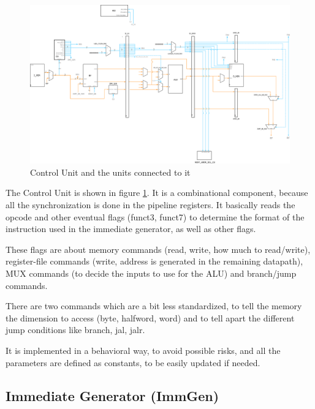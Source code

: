 \documentclass[a4paper]{article}
\begin{document}
\begin{figure}[hbtp]
    \centering
    \includegraphics[scale=0.3]{../cu/ref/schematic/cu.png}
    \caption{Control Unit and the units connected to it}
    \label{fig:cu}
\end{figure}

The Control Unit is shown in figure \ref{fig:cu}. It is a combinational component, because all the synchronization is done in the pipeline registers. It basically reads the opcode and other eventual flags (funct3, funct7) to determine the format of the instruction used in the immediate generator, as well as other flags.

These flags are about memory commands (read, write, how much to read/write), register-file commands (write, address is generated in the remaining datapath), MUX commands (to decide the inputs to use for the ALU) and branch/jump commands.

There are two commands which are a bit less standardized, to tell the memory the dimension to access (byte, halfword, word) and to tell apart the different jump conditions like branch, jal, jalr.

It is implemented in a behavioral way, to avoid possible risks, and all the parameters are defined as constants, to be easily updated if needed.

\subsection{Immediate Generator (ImmGen)}
\end{document}
